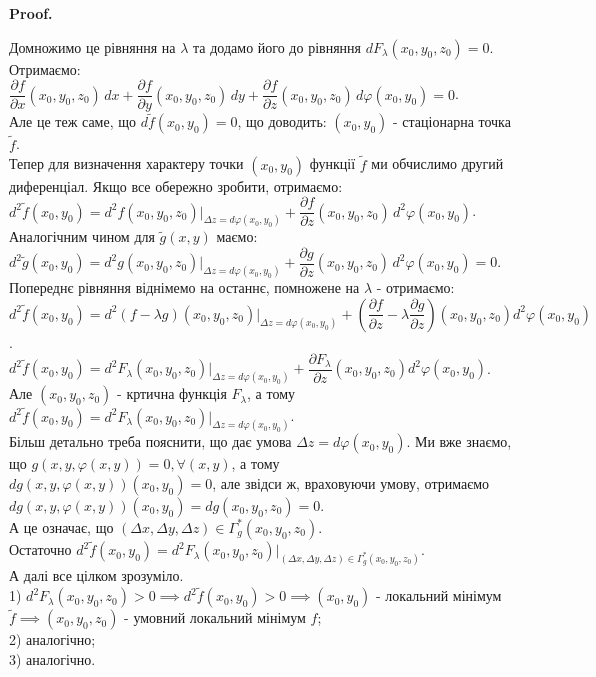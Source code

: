 \documentclass[a4paper, 10pt]{article}
\makeatletter
\def\departial#1#2{\dfrac{\partial {#1}}{\partial {#2}}}
\def\qed{$\blacksquare$}
\theoremstyle{theoremdd}
\theoremstyle{theoremdd}
\theoremstyle{theoremdd}
\theoremstyle{theoremdd}
\theoremstyle{theoremdd}
\theoremstyle{theoremdd}
\theoremstyle{theoremdd}
\theoremstyle{theoremdd}
\theoremstyle{theoremdd}
\renewenvironment{proof}[1][Proof.\\]{\par
\pushQED{\hfill \qed}%
\normalfont \topsep6\p@\@plus6\p@\relax
\trivlist
\item\relax
{\bfseries
#1\@addpunct{.}}\hspace\labelsep\ignorespaces
}{%
\popQED\endtrivlist\@endpefalse
}
\makeatother
\begin{document}
\begin{proof}
Домножимо це рівняння на $\lambda$ та додамо його до рівняння $dF_\lambda(x_0,y_0,z_0) = 0$. Отримаємо:\\
$\departial{f}{x}(x_0,y_0,z_0)\,dx + \departial{f}{y}(x_0,y_0,z_0)\,dy + \departial{f}{z}(x_0,y_0,z_0)\,d\varphi(x_0,y_0) = 0$.\\
Але це теж саме, що $d\tilde{f}(x_0,y_0) = 0$, що доводить: $(x_0,y_0)$ - стаціонарна точка $\tilde{f}$.
\bigskip \\
Тепер для визначення характеру точки $(x_0,y_0)$ функції $\tilde{f}$ ми обчислимо другий диференціал. Якщо все обережно зробити, отримаємо:\\
$d^2 \tilde{f}(x_0,y_0) = d^2 f(x_0,y_0,z_0)|_{\Delta z = d\varphi(x_0,y_0)} + \departial{f}{z}(x_0,y_0,z_0) \, d^2\varphi(x_0,y_0)$.\\
Аналогічним чином для $\tilde{g}(x,y)$ маємо:\\
$d^2 \tilde{g}(x_0,y_0) = d^2 g(x_0,y_0,z_0)|_{\Delta z = d\varphi(x_0,y_0)} + \departial{g}{z}(x_0,y_0,z_0)\, d^2\varphi(x_0,y_0) = 0$.\\
Попереднє рівняння віднімемо на останнє, помножене на $\lambda$ - отримаємо:\\
$d^2 \tilde{f}(x_0,y_0) = d^2 (f-\lambda g)(x_0,y_0,z_0)|_{\Delta z = d\varphi(x_0,y_0)} + \left( \departial{f}{z} - \lambda \departial{g}{z} \right)(x_0,y_0,z_0) d^2 \varphi(x_0,y_0)$.\\
$d^2 \tilde{f}(x_0,y_0) = d^2 F_\lambda (x_0,y_0,z_0) |_{\Delta z = d\varphi(x_0,y_0)} + \departial{F_\lambda}{z}(x_0,y_0,z_0) d^2 \varphi(x_0,y_0)$.\\
Але $(x_0,y_0,z_0)$ - кртична функція $F_\lambda$, а тому\\
$d^2 \tilde{f}(x_0,y_0) = d^2 F_\lambda(x_0,y_0,z_0) |_{\Delta z = d\varphi(x_0,y_0)}$.\\
Більш детально треба пояснити, що дає умова $\Delta z = d\varphi(x_0,y_0)$. Ми вже знаємо, що $g(x,y,\varphi(x,y)) = 0, \forall (x,y)$, а тому\\
$dg(x,y,\varphi(x,y))(x_0,y_0) = 0$, але звідси ж, враховуючи умову, отримаємо\\
$dg(x,y,\varphi(x,y))(x_0,y_0) = dg(x_0,y_0,z_0) = 0$.\\
А це означає, що $(\Delta x, \Delta y, \Delta z) \in \Gamma_g^*(x_0,y_0,z_0)$.\\
Остаточно $d^2 \tilde{f}(x_0,y_0) = d^2 F_\lambda(x_0,y_0,z_0) |_{(\Delta x, \Delta y, \Delta z) \in \Gamma_g^*(x_0,y_0,z_0)}$.\\
А далі все цілком зрозуміло.\\
1) $d^2 F_\lambda(x_0,y_0,z_0) > 0 \implies d^2 \tilde{f}(x_0,y_0) > 0 \implies (x_0,y_0)$ - локальний мінімум $\tilde{f} \implies (x_0,y_0,z_0)$ - умовний локальний мінімум $f$;\\
2) аналогічно;\\
3) аналогічно.
\end{proof}
\end{document}
